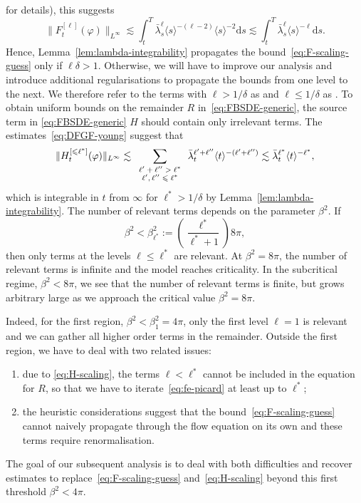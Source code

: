 \documentclass[11pt, a4paper]{scrartcl}
\numberwithin{equation}{section}
\theoremstyle{plain}
\theoremstyle{remark}
\newcommand{\assign}{:=}
\newcommand{\mathd}{\mathrm{d}}
\newcommand{\tmscript}[1]{\text{\scriptsize{$#1$}}}
\newcommand{\tmtextit}[1]{\text{{\itshape{#1}}}}
\newenvironment{enumeratealpha}{\begin{enumerate}[a{\textup{)}}] }{\end{enumerate}}
\begin{document}
for details), this suggests
\[ \| F^{[\ell]}_t (\varphi) \|_{L^{\infty}} \lesssim \int_t^T
   \bar{\lambda}_s^{\ell} \langle s \rangle^{- (\ell - 2)} \langle s \rangle^{- 2}
   \mathd s \lesssim \int_t^T \bar{\lambda}_s^{\ell} \langle s \rangle^{-\ell} \mathd
   s . \]
Hence, Lemma~\ref{lem:lambda-integrability} propagates the
bound~\eqref{eq:F-scaling-guess} only if $\ell \delta > 1$. Otherwise, we will
have to improve our analysis and introduce additional regularisations to
propagate the bounds from one level to the next. We therefore refer to the
terms with $\ell > 1 / \delta$ as \tmtextit{irrelevant} and $\ell \leqslant 1
/ \delta$ as \tmtextit{relevant}. To obtain uniform bounds on the remainder
$R$ in~\eqref{eq:FBSDE-generic}, the source term in \eqref{eq:FBSDE-generic}
$H$ should contain only irrelevant terms. The estimates~\eqref{eq:DFGF-young}
suggest that
\begin{equation}
  \| H_t^{[\leqslant \ell^{\ast}]} (\varphi) \|_{L^{\infty}} \lesssim
  \sum_{\tmscript{\begin{array}{c}
    \ell' + \ell'' > \ell^{\ast}\\
    \ell', \ell'' \leqslant \ell^{\ast}
  \end{array}}} \bar{\lambda}_t^{\ell' + \ell''} \langle t \rangle^{- (\ell' +
  \ell'')} \lesssim \bar{\lambda}_t^{\ell^{\ast}} \langle t \rangle^{-\ell^{\ast}},
  \label{eq:H-scaling}
\end{equation}
which is integrable in $t$ from $\infty$ for $\ell^{\ast} > 1 / \delta$ by
Lemma~\ref{lem:lambda-integrability}. The number of relevant terms depends on
the parameter $\beta^2$. If
\begin{equation}
  \beta^2 < \beta_{\ell^{\ast}}^2 \assign \left(
  \frac{\ell^{\ast}}{\ell^{\ast} + 1} \right) 8 \pi, \label{eq:thresholds}
\end{equation}
then only terms at the levels $\ell \leqslant \ell^{\ast}$ are relevant. At
$\beta^2 = 8 \pi$, the number of relevant terms is infinite and the model
reaches criticality. In the subcritical regime, $\beta^2 < 8 \pi$, we see that
the number of relevant terms is finite, but grows arbitrary large as we
approach the critical value $\beta^2 = 8 \pi$.

Indeed, for the first region, $\beta^2 < \beta_1^2 = 4 \pi$, only the first
level $\ell = 1$ is relevant and we can gather all higher order terms in the
remainder. Outside the first region, we have to deal with two related issues:
\begin{enumeratealpha}
  \item due to \eqref{eq:H-scaling}, the terms $\ell < \ell^{\ast}$ cannot be
  included in the equation for $R$, so that we have to
  iterate~\eqref{eq:fe-picard} at least up to $\ell^{\ast}$;
  
  \item the heuristic considerations suggest that the
  bound~\eqref{eq:F-scaling-guess} cannot naively propagate through the flow
  equation on its own and these terms require renormalisation.
\end{enumeratealpha}
The goal of our subsequent analysis is to deal with both difficulties and
recover estimates to replace~\eqref{eq:F-scaling-guess}
and~\eqref{eq:H-scaling} beyond this first threshold $\beta^2 < 4 \pi$.
\end{document}
